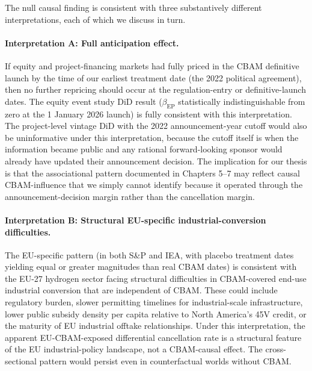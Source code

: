 \documentclass[11pt,a4paper]{article}
\newcommand{\bep}{\beta_{\mathrm{EP}}}
\begin{document}
The null causal finding is consistent with three substantively different interpretations, each of which we discuss in turn.

\paragraph{Interpretation A: Full anticipation effect.}
If equity and project-financing markets had fully priced in the CBAM definitive launch by the time of our earliest treatment date (the 2022 political agreement), then no further repricing should occur at the regulation-entry or definitive-launch dates. The equity event study DiD result ($\bep$ statistically indistinguishable from zero at the 1 January 2026 launch) is fully consistent with this interpretation. The project-level vintage DiD with the 2022 announcement-year cutoff would also be uninformative under this interpretation, because the cutoff itself is when the information became public and any rational forward-looking sponsor would already have updated their announcement decision. The implication for our thesis is that the associational pattern documented in Chapters 5--7 may reflect causal CBAM-influence that we simply cannot identify because it operated through the announcement-decision margin rather than the cancellation margin.

\paragraph{Interpretation B: Structural EU-specific industrial-conversion difficulties.}
The EU-specific pattern (in both S\&P and IEA, with placebo treatment dates yielding equal or greater magnitudes than real CBAM dates) is consistent with the EU-27 hydrogen sector facing structural difficulties in CBAM-covered end-use industrial conversion that are independent of CBAM. These could include regulatory burden, slower permitting timelines for industrial-scale infrastructure, lower public subsidy density per capita relative to North America's 45V credit, or the maturity of EU industrial offtake relationships. Under this interpretation, the apparent EU-CBAM-exposed differential cancellation rate is a structural feature of the EU industrial-policy landscape, not a CBAM-causal effect. The cross-sectional pattern would persist even in counterfactual worlds without CBAM.
\end{document}
